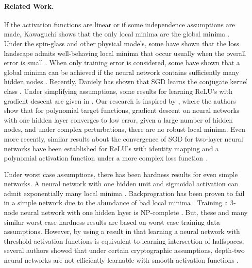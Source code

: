 
\paragraph{Related Work.}
If the activation functions are linear or
if some independence assumptions are made, Kawaguchi shows that the
only local minima are the global minima \cite{Kawaguchi16a}. Under the
spin-glass and other physical models, some have shown that the loss
landscape admits well-behaving local minima that occur usually when the
overall error is small
\cite{ChoromanskaHMAL14, DauphinPGCGB14}. When only training
error is considered, some have shown that a global minima can be
achieved if the neural network contains sufficiently many hidden nodes
\cite{SoudryC16}. Recently, Daniely has shown that SGD learns the conjugate kernel class \cite{daniely2017sgd}. Under simplifying assumptions, some results for learning ReLU's with gradient descent are given in \cite{tian2017analytical, brutzkus2017globally}. Our research is inspired by
\cite{valiant2014learning}, where the authors show that for polynomial 
target functions, gradient descent on neural networks
with one hidden layer converges to low error, given a large
number of hidden nodes, and under complex perturbations,
there are no robust local minima. Even more recently, similar results about the convergence of SGD for two-layer neural networks have been established for ReLU's with identity mapping and a polynomial activation function under a more complex loss function \cite{li2017convergence,ge2017learning}.

Under worst case assumptions, there has been hardness results for even simple networks. A neural network with one hidden unit and sigmoidal activation can admit exponentially many local minima \cite{Auer}. Backprogration has been proven to fail in a simple network due to the abundance of bad local minima \cite{brady1989back}. Training a 3-node neural network with one hidden layer is { NP}-complete \cite{BlumR88}.  But, these and many similar worst-case hardness results are based on worst case training data assumptions. However, by using a result in \cite{klivans2006cryptographic} that learning a neural network with threshold activation functions is equivalent to learning intersection of halfspaces, several authors showed that under certain cryptographic assumptions, depth-two neural networks are not efficiently learnable with smooth activation functions \cite{LivniSS14, ZhangLWJ15, ZhangLJ15}.


